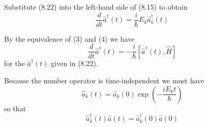 \documentclass[12pt]{article}
\begin{document}
Substitute (8.22) into the left-hand side of (8.15) to obtain
\begin{equation*}
\frac{d}{dt}\hat a^\dag(t)=\frac{i}{\hbar}E_k\hat a_k^\dag(t)
\tag{4}
\end{equation*}

By the equivalence of (3) and (4) we have
\begin{equation*}
\frac{d}{dt}\hat a^\dag(t)=-\frac{i}{\hbar}\left[\hat a^\dag(t),\hat H\right]
\end{equation*}
for the $\hat a^\dag(t)$ given in (8.22).

\bigskip
Because the number operator is time-independent we must have
\begin{equation*}
\hat a_k(t)=\hat a_k(0)\exp\left(-\frac{iE_kt}{\hbar}\right)
\end{equation*}
so that
\begin{equation*}
\hat a_k^\dag(t)\hat a(t)=\hat a_k^\dag(0)\hat a(0)
\end{equation*}
\end{document}
